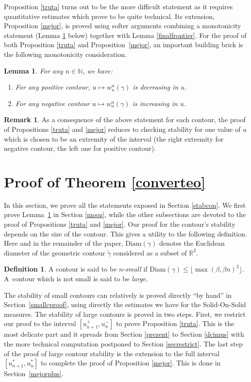 \documentclass[10pt]{amsart}
\newenvironment{enumeratei}
{\bgroup\def\theenumi{\roman{enumi}}\def\theenumii{\Alph{enumii}}\begin{enumerate}}
{\end{enumerate}\egroup}
\numberwithin{equation}{section}
\theoremstyle{plain}
\newtheorem{lemma}[theorem]{Lemma}
\theoremstyle{definition}
\newtheorem{rem}[theorem]{Remark}
\newtheorem{definition}[theorem]{Definition}
\newcommand{\Diam}{\mathrm{Diam}}
\newcommand{\bbN}{{\ensuremath{\mathbb N}} }
\newcommand{\bbR}{{\ensuremath{\mathbb R}} }
\newcommand{\gb}{\beta}
\begin{document}
Proposition \ref{truta} turns out to be the more difficult statement as it requires quantitative estimates which prove to be quite technical.
Its extension, Proposition \ref{mejor}, is proved using softer arguments
combining a monotonicity statement (Lemma \ref{mozon} below) together with Lemma \ref{finalfrontier}.
For the proof of both Proposition \ref{truta} and Proposition~\ref{mejor}, an important building brick is the following monotonicity consideration.
\begin{lemma}\label{mozon}
For any $n\in \bbN$, we have:
\begin{enumeratei}
\item
For any positive contour, $u\mapsto w^u_n(\gamma)$ is decreasing in $u$.
\item
For any negative contour $u\mapsto w^u_n(\gamma)$ is increasing in $u$.
\end{enumeratei}
\end{lemma}
\begin{rem} \label{mouton}
As a consequence of the above statement for each contour, the proof of Propositions \ref{truta} and \ref{mejor} reduces to checking
stability for one value of $u$ which is chosen to be an extremity of the interval (the right extremity for negative contour, the left one for positive contour).
\end{rem}

\section{Proof of Theorem \ref{converteo}}\label{ponverteo}

In this section, we prove all the statements exposed in Section \ref{stabcon}.
We first prove Lemma~\ref{mozon} in Section \ref{mooz}, while the other subsections are devoted to the proof of Propositions \ref{truta} and \ref{mejor}.
Our proof for the contour's stability depends on the size of the contour.
This gives a utility to the following definition.
Here and in the remainder of the paper, $\Diam(\gamma)$ denotes the Euclidean diameter of the geometric contour $\tilde \gamma$ considered as a subset of $\bbR^2$.

\begin{definition}
A contour is said to be $n$-\textit{small} if $\Diam(\gamma)\le \lfloor \max(\gb,\gb n)^2 \rfloor$.
A~contour which is not small is said to be \textit{large}.
\end{definition}

The stability of small contours can relatively is proved directly ``by hand'' in Section~\ref{smallcproof}, using directly the estimates we have for the Solid-On-Solid measures.
The stability of large contours is proved in two steps. First, we restrict our proof to the interval $[u^{+}_{n+1},u^{-}_n]$ to prove Proposition \ref{truta}.
This is the most delicate part and it spreads from Section \ref{prezent} to Section \ref{dcimus} with the more technical computation postponed to Section
\ref{secrestrict}.
The last step of the proof of large contour stability is the extension to the full interval $[u^{*}_{n+1},u^{*}_n]$ to complete the proof of Proposition \ref{mejor}. This is done in Section~\ref{mejorplus}.
\end{document}
